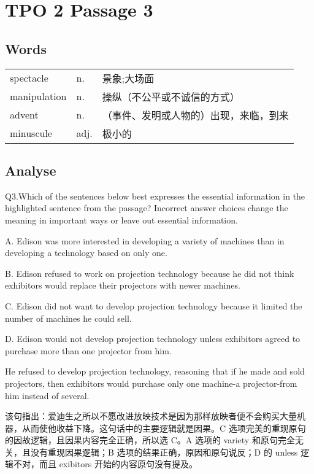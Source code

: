 \section{TPO 2 Passage 3}

\subsection{Words}

\begin{tabular}{lll}
    spectacle    & n.   & 景象;大场面              \\
    manipulation & n.   & 操纵（不公平或不诚信的方式）      \\
    advent       & n.   & （事件、发明或人物的）出现，来临，到来 \\
    minuscule    & adj. & 极小的                 \\
\end{tabular}

\subsection{Analyse}

\begin{blk}
    \begin{qst}
        Q3.Which of the sentences below best expresses the essential information in the highlighted sentence from the passage? Incorrect answer choices change the meaning in important ways or leave out essential information.
    \end{qst}

    \begin{chc}
        A. Edison was more interested in developing a variety of machines than in developing a technology based on only one.

        B. Edison refused to work on projection technology because he did not think exhibitors would replace their projectors with newer machines.

        C. Edison did not want to develop projection technology because it limited the number of machines he could sell.

        D. Edison would not develop projection technology unless exhibitors agreed to purchase more than one projector from him.
    \end{chc}

    \begin{psgq}
        He refused to develop projection technology, reasoning that if he made and sold projectors, then exhibitors would purchase only one machine-a projector-from him instead of several.
    \end{psgq}

    \begin{nlz}
        该句指出：爱迪生之所以不愿改进放映技术是因为那样放映者便不会购买大量机器，从而使他收益下降。这句话中的主要逻辑就是因果。C 选项完美的重现原句的因故逻辑，且因果内容完全正确，所以选 C。A 选项的 variety 和原句完全无关，且没有重现因果逻辑；B 选项的结果正确，原因和原句说反；D 的 unless 逻辑不对，而且 exibitors 开始的内容原句没有提及。
    \end{nlz}
\end{blk}

